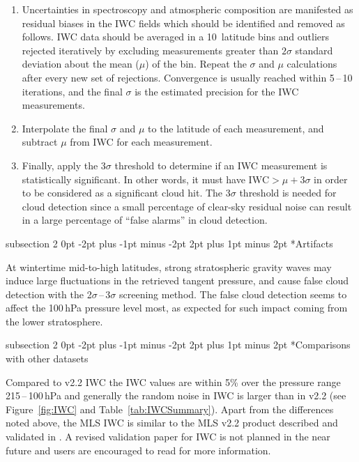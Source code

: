 \documentclass[11pt,draft]{report}
\makeatletter
\renewcommand{\subsection}{\@startsection%
  {subsection}%
  {2}%
  {0pt}%
  {-2pt plus -1pt minus -2pt}%
  {2pt plus 1pt minus 2pt}%
  {\large\sffamily\fontseries{sb}\selectfont\flushleft\color{SectionColor}\figureversion{tabular}}}%
\makeatother
\begin{document}
\begin{description}
\begin{enumerate}
\item Uncertainties in spectroscopy and atmospheric composition are
  manifested as residual biases in the IWC fields which should be
  identified and removed as follows.  IWC data should be averaged in a
  10\degsym\ latitude bins and outliers rejected iteratively by
  excluding measurements greater than $2\sigma$ standard deviation about
  the mean ($\mu$) of the bin. Repeat the $\sigma$ and $\mu$
  calculations after every new set of rejections.  Convergence is
  usually reached within 5\,--\,10 iterations, and the final $\sigma$ is
  the estimated precision for the IWC measurements.
\item Interpolate the final $\sigma$ and $\mu$ to the latitude of
  each measurement, and subtract $\mu$ from IWC for each measurement.
\item Finally, apply the 3$\sigma$ threshold to determine if an IWC
  measurement is statistically significant. In other words, it must have
  $\text{IWC} > \mu + 3\sigma$ in order to be considered as a
  significant cloud hit.  The $3\sigma$ threshold is needed for cloud
  detection since a small percentage of clear-sky residual noise can
  result in a large percentage of ``false alarms'' in cloud detection.
\end{enumerate}
\end{description}

\subsection*{Artifacts}

At wintertime mid-to-high latitudes, strong stratospheric gravity waves
may induce large fluctuations in the retrieved tangent pressure, and
cause false cloud detection with the 2$\sigma$\,--\,3$\sigma$ screening
method. The false cloud detection seems to affect the 100\,hPa pressure
level most, as expected for such impact coming from the lower
stratosphere.

\subsection*{Comparisons with other datasets}

Compared to v2.2 IWC the \thisv IWC values are within 5\% over the
pressure range 215\,--\,100\,hPa and generally the random noise in
\thisv IWC is larger than in v2.2 (see Figure~\ref{fig:IWC} and
Table~\ref{tab:IWCSummary}).  Apart from the differences noted above,
the MLS \thisv IWC is similar to the MLS v2.2 product described and
validated in \citet{WuEtal08}.  A revised validation paper for IWC is
not planned in the near future and users are encouraged to read
\citet{WuEtal08} for more information.
\end{document}
